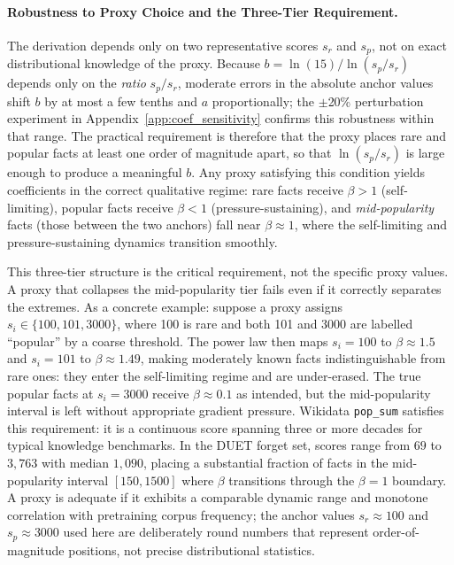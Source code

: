 \paragraph{Robustness to Proxy Choice and the Three-Tier Requirement.}
The derivation depends only on two representative scores $s_r$ and $s_p$, not on exact distributional knowledge of the proxy. Because $b = \ln(15)/\ln(s_p/s_r)$ depends only on the \emph{ratio} $s_p/s_r$, moderate errors in the absolute anchor values shift $b$ by at most a few tenths and $a$ proportionally; the $\pm$20\% perturbation experiment in Appendix~\ref{app:coef_sensitivity} confirms this robustness within that range. The practical requirement is therefore that the proxy places rare and popular facts at least one order of magnitude apart, so that $\ln(s_p/s_r)$ is large enough to produce a meaningful $b$. Any proxy satisfying this condition yields coefficients in the correct qualitative regime: rare facts receive $\beta > 1$ (self-limiting), popular facts receive $\beta < 1$ (pressure-sustaining), and \emph{mid-popularity} facts (those between the two anchors) fall near $\beta \approx 1$, where the self-limiting and pressure-sustaining dynamics transition smoothly.

This three-tier structure is the critical requirement, not the specific proxy values. A proxy that collapses the mid-popularity tier fails even if it correctly separates the extremes. As a concrete example: suppose a proxy assigns $s_i \in \{100, 101, 3000\}$, where 100 is rare and both 101 and 3000 are labelled ``popular'' by a coarse threshold. The power law then maps $s_i = 100$ to $\beta \approx 1.5$ and $s_i = 101$ to $\beta \approx 1.49$, making moderately known facts indistinguishable from rare ones: they enter the self-limiting regime and are under-erased. The true popular facts at $s_i = 3000$ receive $\beta \approx 0.1$ as intended, but the mid-popularity interval is left without appropriate gradient pressure. Wikidata \texttt{pop\_sum} satisfies this requirement: it is a continuous score spanning three or more decades for typical knowledge benchmarks. In the DUET forget set, scores range from $69$ to $3{,}763$ with median $1{,}090$, placing a substantial fraction of facts in the mid-popularity interval $[150, 1500]$ where $\beta$ transitions through the $\beta = 1$ boundary. A proxy is adequate if it exhibits a comparable dynamic range and monotone correlation with pretraining corpus frequency; the anchor values $s_r \approx 100$ and $s_p \approx 3000$ used here are deliberately round numbers that represent order-of-magnitude positions, not precise distributional statistics.





